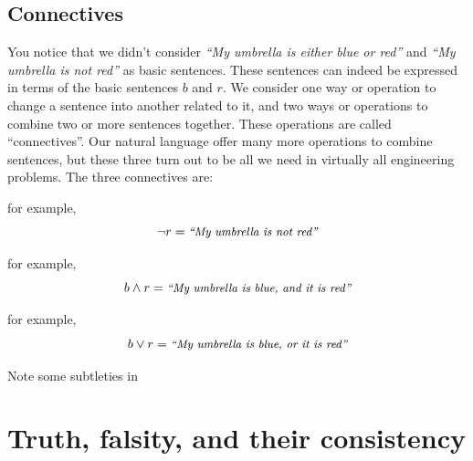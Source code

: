 \documentclass[
  letterpaper,
  DIV=11,
  numbers=noendperiod,
  oneside]{scrreprt}
\providecommand{\tightlist}{%
  \setlength{\itemsep}{0pt}\setlength{\parskip}{0pt}}\usepackage{longtable,booktabs,array}
\begin{document}
\hypertarget{connectives}{%
\subsection{Connectives}\label{connectives}}

You notice that we didn't consider \emph{``My umbrella is either blue or
red''} and \emph{``My umbrella is not red''} as basic sentences. These
sentences can indeed be expressed in terms of the basic sentences \(b\)
and \(r\). We consider one way or operation to change a sentence into
another related to it, and two ways or operations to combine two or more
sentences together. These operations are called ``connectives''. Our
natural language offer many more operations to combine sentences, but
these three turn out to be all we need in virtually all engineering
problems. The three connectives are:

\begin{description}
\tightlist
\item[Not: \(\lnot\)]
for example, \[
\lnot r = \textit{\small``My umbrella is not red''}
\]
\item[And: \(\land\)]
for example, \[
b \land r = \textit{\small``My umbrella is blue, and it is red''}
\]
\item[Or: \(\lor\)]
for example, \[
b \lor r = \textit{\small``My umbrella is blue, or it is red''}
\]
\end{description}

\begin{tcolorbox}[enhanced jigsaw, colframe=quarto-callout-warning-color-frame, toprule=.15mm, bottomrule=.15mm, arc=.35mm, opacityback=0, colback=white, rightrule=.15mm, breakable, leftrule=.75mm, left=2mm]
\begin{minipage}[t]{5.5mm}
\textcolor{quarto-callout-warning-color}{\faExclamationTriangle}
\end{minipage}%
\begin{minipage}[t]{\textwidth - 5.5mm}

\textbf{}\vspace{2mm}

Note some subtleties in

\end{minipage}%
\end{tcolorbox}

\hypertarget{truth-falsity-and-their-consistency}{%
\section{Truth, falsity, and their
consistency}\label{truth-falsity-and-their-consistency}}
\end{document}
